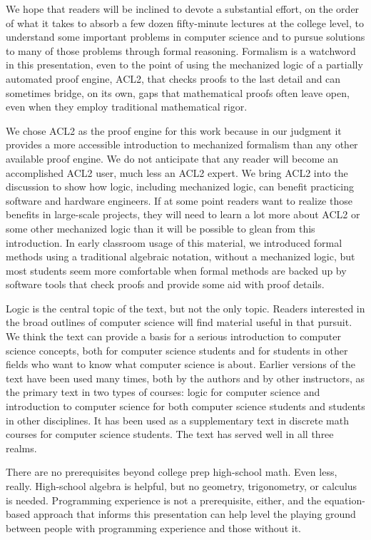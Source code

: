 We hope that readers will be inclined
to devote a substantial effort, on the order
of what it takes to absorb a few dozen fifty-minute
lectures at the college level,
to understand some important problems in computer science and
to pursue solutions to many of those problems through formal reasoning.
Formalism is a watchword in this presentation, even to the
point of using the mechanized logic of a partially automated proof engine,
ACL2, that checks proofs to the last detail and can sometimes 
bridge, on its own, gaps that mathematical
proofs often leave open, even when they employ traditional
mathematical rigor.

We chose ACL2 as the proof engine for this work
because in our judgment it provides a more accessible
introduction to mechanized formalism than any other
available proof engine. We do not anticipate that any
reader will become an accomplished ACL2 user,
much less an ACL2 expert. We bring ACL2 into the discussion
to show how logic, including mechanized logic,
can benefit practicing software and hardware engineers.
If at some point readers want to realize those benefits in
large-scale projects, they will need to learn a lot more
about ACL2 or some other mechanized logic than it will
be possible to glean from this introduction.
In early classroom usage of this material,
we introduced formal methods using a traditional algebraic notation,
without a mechanized logic, but most students seem more comfortable
when formal methods are backed up by software tools
that check proofs and provide some aid with proof details.

Logic is the central topic of the text, but not the only topic.
Readers interested in the broad outlines of computer science
will find material useful in that pursuit.
We think the text can provide a basis for a serious introduction
to computer science concepts, both for computer science students
and for students in other fields who want to know
what computer science is about.
Earlier versions of the text have been used many times,
both by the authors and by other instructors,
as the primary text in two types of courses: logic for computer science
and introduction to computer science for both computer science students
and students in other disciplines. It has been used as a supplementary
text in discrete math courses for computer science students.
The text has served well in all three realms.

There are no prerequisites beyond college prep high-school math.
Even less, really.
High-school algebra is helpful,
but no geometry, trigonometry, or calculus is needed.
Programming experience is not a prerequisite, either, and 
the equation-based approach that informs this presentation can
help level the playing ground between people
with programming experience and those without it.

